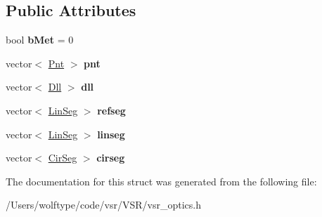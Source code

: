 \subsection*{Public Attributes}
\begin{DoxyCompactItemize}
\item 
\hypertarget{structvsr_1_1_trajectory_a2524834dfa7f126b771f9c8582bf1f8b}{bool {\bfseries b\-Met} = 0}\label{structvsr_1_1_trajectory_a2524834dfa7f126b771f9c8582bf1f8b}

\item 
\hypertarget{structvsr_1_1_trajectory_a2c8e7c710d7ed26097941efc7a7fdf9c}{vector$<$ \hyperlink{namespacevsr_a2d05beb9721c5d9211b479af6d47222d}{Pnt} $>$ {\bfseries pnt}}\label{structvsr_1_1_trajectory_a2c8e7c710d7ed26097941efc7a7fdf9c}

\item 
\hypertarget{structvsr_1_1_trajectory_afa5efb83866e7bc850b8b9fdfee34714}{vector$<$ \hyperlink{namespacevsr_a6c6892b7aec25cfb16492501e2e35b11}{Dll} $>$ {\bfseries dll}}\label{structvsr_1_1_trajectory_afa5efb83866e7bc850b8b9fdfee34714}

\item 
\hypertarget{structvsr_1_1_trajectory_afc33a59fb7261874a7fa660345303107}{vector$<$ \hyperlink{structvsr_1_1_trajectory_1_1_lin_seg}{Lin\-Seg} $>$ {\bfseries refseg}}\label{structvsr_1_1_trajectory_afc33a59fb7261874a7fa660345303107}

\item 
\hypertarget{structvsr_1_1_trajectory_a815dd212fdef2401e32f6c645a1135cd}{vector$<$ \hyperlink{structvsr_1_1_trajectory_1_1_lin_seg}{Lin\-Seg} $>$ {\bfseries linseg}}\label{structvsr_1_1_trajectory_a815dd212fdef2401e32f6c645a1135cd}

\item 
\hypertarget{structvsr_1_1_trajectory_ad897357ccde5e53cc779aa2be3831d74}{vector$<$ \hyperlink{structvsr_1_1_trajectory_1_1_cir_seg}{Cir\-Seg} $>$ {\bfseries cirseg}}\label{structvsr_1_1_trajectory_ad897357ccde5e53cc779aa2be3831d74}

\end{DoxyCompactItemize}


The documentation for this struct was generated from the following file\-:\begin{DoxyCompactItemize}
\item 
/\-Users/wolftype/code/vsr/\-V\-S\-R/vsr\-\_\-optics.\-h\end{DoxyCompactItemize}
